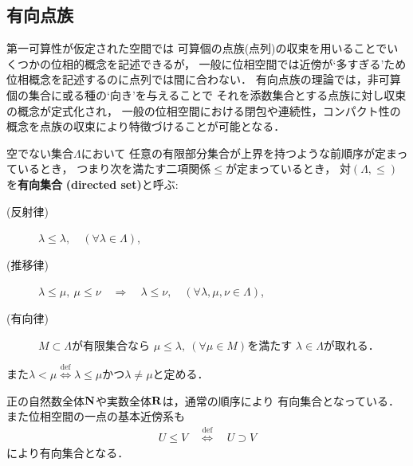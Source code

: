 \subsection{有向点族}
	第一可算性が仮定された空間では
	可算個の点族(点列)の収束を用いることでいくつかの位相的概念を記述できるが，
	一般に位相空間では近傍が`多すぎる'ため位相概念を記述するのに点列では間に合わない．
	有向点族の理論では，非可算個の集合に或る種の`向き'を与えることで
	それを添数集合とする点族に対し収束の概念が定式化され，
	一般の位相空間における閉包や連続性，コンパクト性の概念を点族の収束により特徴づけることが可能となる．
	
	\begin{screen}
		\begin{dfn}[有向集合]
			空でない集合$\Lambda$において
			任意の有限部分集合が上界を持つような前順序が定まっているとき，
			つまり次を満たす二項関係$\leq$が定まっているとき，
			対$(\Lambda,\leq)$を{\bf 有向集合}
			{\bf (directed set)}と呼ぶ:
			\begin{description}
				\item[(反射律)] $\lambda \leq \lambda,\quad (\forall \lambda \in \Lambda)$,
				\item[(推移律)] $\lambda \leq \mu,\ \mu \leq \nu 
					\quad \Longrightarrow \quad \lambda \leq \nu,\quad 
					(\forall \lambda,\mu,\nu \in \Lambda)$,
				\item[(有向律)] 
					$M \subset \Lambda$が有限集合なら
					$\mu \leq \lambda,\ (\forall \mu \in M)$を満たす
					$\lambda \in \Lambda$が取れる．
			\end{description}
			また$\lambda < \mu \overset{\mathrm{def}}{\Longleftrightarrow} 
			\mbox{$\lambda \leq \mu$かつ$\lambda \neq \mu$}$と定める．
		\end{dfn}
	\end{screen}
	正の自然数全体$\mathbf{N}$や実数全体$\mathbf{R}$は，通常の順序により
	有向集合となっている．また位相空間の一点の基本近傍系も
	\begin{align}
		U \leq V \quad \overset{\mathrm{def}}{\Longleftrightarrow} \quad
		U \supset V
	\end{align}
	により有向集合となる．
	
